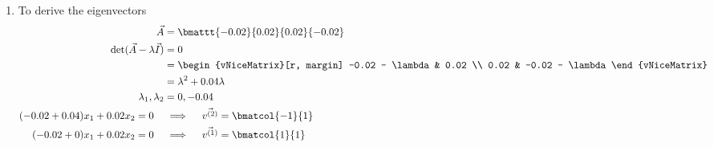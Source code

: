 \begin{enumerate}
    \item To derive the eigenvectors
          \begin{align}
              \vec{A}                                & = \bmattt{-0.02}{0.02}{0.02}{-0.02} \\
              \det(\vec{A} - \lambda \vec{I})        & = 0                                 \\
                                                     & = \begin{vNiceMatrix}[r, margin]
                                                             -0.02 - \lambda & 0.02            \\
                                                             0.02            & -0.02 - \lambda
                                                         \end{vNiceMatrix} \\
                                                     & = \lambda^{2} + 0.04\lambda         \\
              \lambda_1, \lambda_2                   & = 0, -0.04                          \\
              (-0.02 + 0.04)x_1 + 0.02 x_2 = 0 \quad & \implies
              \quad \vec{v^{(2)}} = \bmatcol{-1}{1}                                        \\
              (-0.02 + 0)x_1 + 0.02 x_2 = 0 \quad    & \implies
              \quad \vec{v^{(1)}} = \bmatcol{1}{1}
          \end{align}


\end{enumerate}
